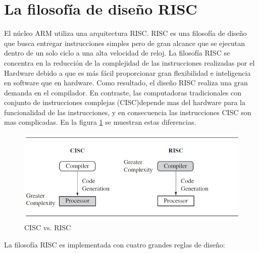 \documentclass[12pt]{book}
\theoremstyle{definition}
\theoremstyle{remark}
\theoremstyle{plain}
\begin{document}
\section{La filosofía de diseño RISC}

El núcleo ARM utiliza una arquitectura RISC. RISC es una filosofía de diseño que busca entregar instrucciones simples pero de gran alcance que se ejecutan dentro de un solo ciclo a una alta velocidad de reloj. La filosofía RISC se concentra en la reducción de la complejidad de las instrucciones realizadas por el Hardware debido a que es más fácil proporcionar gran flexibilidad e inteligencia en software que en hardware. Como resultado, el diseño RISC realiza una gran demanda en el compilador. En contraste, las computadoras tradicionales con conjunto de instrucciones complejas (CISC)depende mas del hardware para la funcionalidad de las instrucciones, y en consecuencia las instrucciones CISC son mas complicadas. En la figura \ref{fig3} se muestran estas diferencias.


\begin{figure}
\centering
\includegraphics[width=5in]{CISC_RISC.jpg}
\caption{CISC vs. RISC}
\label{fig3}
\end{figure}

La filosofía RISC es implementada con cuatro grandes reglas de diseño:
\end{document}
